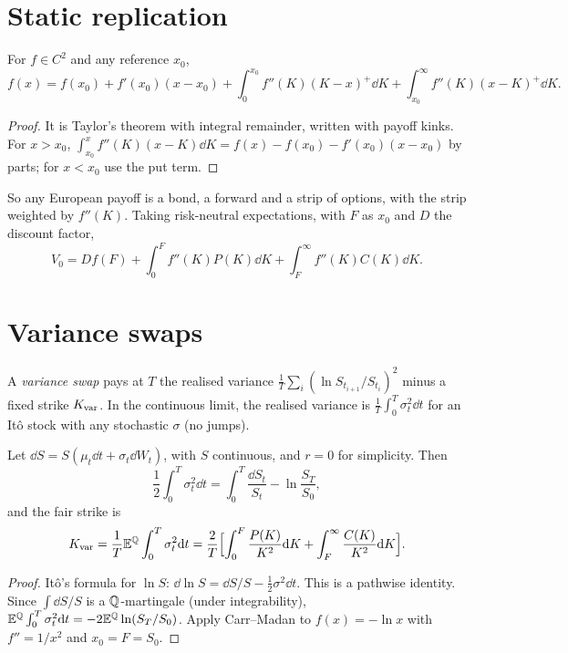 \section{Static replication}

\begin{theorem}\label{thm:carrmadan}
For $f\in C^2$ and any reference $x_0$,
\[
f(x)=f(x_0)+f'(x_0)(x-x_0)+\int_0^{x_0}f''(K)(K-x)^+\dd K+\int_{x_0}^\infty f''(K)(x-K)^+\dd K.
\]
\end{theorem}
\begin{proof}
It is Taylor's theorem with integral remainder, written with payoff kinks. For $x>x_0$, $\int_{x_0}^xf''(K)(x-K)\dd K=f(x)-f(x_0)-f'(x_0)(x-x_0)$ by parts; for $x<x_0$ use the put term.
\end{proof}

So any European payoff is a bond, a forward and a strip of options, with the strip weighted by $f''(K)$. Taking risk-neutral expectations, with $F$ as $x_0$ and $D$ the discount factor,
\[
V_0=Df(F)+\int_0^{F}f''(K)P(K)\dd K+\int_F^\infty f''(K)C(K)\dd K.
\]

\section{Variance swaps}\label{sec:varswap}

A \emph{variance swap} pays at $T$ the realised variance $\frac1T\sum_i(\ln S_{t_{i+1}}/S_{t_i})^2$ minus a fixed strike $K_{\rm var}$. In the continuous limit, the realised variance is $\frac1T\int_0^T\sigma_t^2\dd t$ for an It\^o stock with any stochastic $\sigma$ (no jumps).

\begin{theorem}\label{thm:varswap}
Let $\dd S=S(\mu_t\dd t+\sigma_t\dd W_t)$, with $S$ continuous, and $r=0$ for simplicity. Then
\[
\frac12\int_0^T\sigma_t^2\dd t=\int_0^T\frac{\dd S_t}{S_t}-\ln\frac{S_T}{S_0},
\]
and the fair strike is
\[
K_{\rm var}=\frac1T\mathbb{E}^{\mathbb{Q}}\int_0^T\sigma_t^2\mathrm{d} t=\frac2T\Bigl[\int_0^{F}\frac{P(K)}{K^2}\mathrm{d} K+\int_{F}^\infty\frac{C(K)}{K^2}\mathrm{d} K\Bigr].
\]
\end{theorem}
\begin{proof}
It\^o's formula for $\ln S$: $\dd\ln S=\dd S/S-\tfrac12\sigma^2\dd t$. This is a pathwise identity. Since $\int\dd S/S$ is a $\mathbb{Q}$-martingale (under integrability), $\mathbb{E}^{\mathbb{Q}}\int_0^T\sigma_t^2\mathrm{d} t=-2\mathbb{E}^{\mathbb{Q}}\ln(S_T/S_0)$. Apply Carr--Madan to $f(x)=-\ln x$ with $f''=1/x^2$ and $x_0=F=S_0$.
\end{proof}

